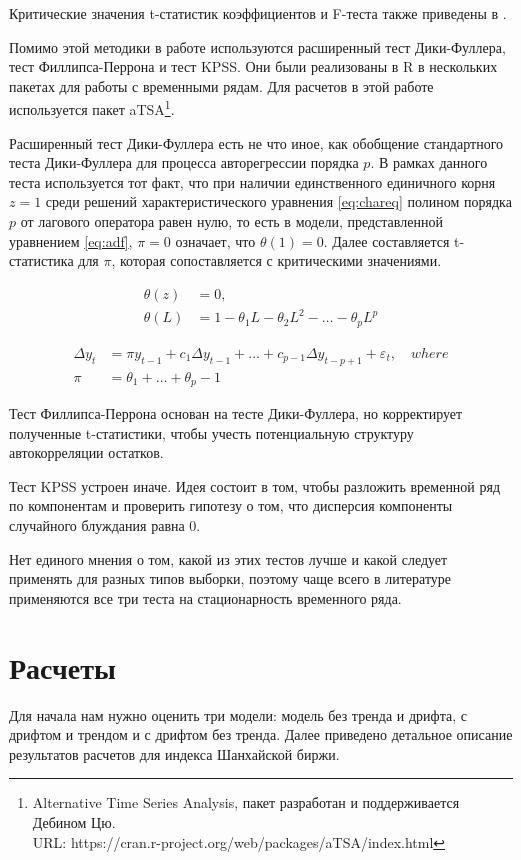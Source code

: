 \documentclass[a4paper,12pt]{article}
\begin{document}
Критические значения t-статистик коэффициентов и F-теста также приведены в \cite{Dickey1981}.

Помимо этой методики в работе используются расширенный тест Дики-Фуллера, тест Филлипса-Перрона и тест KPSS. Они были реализованы в R в нескольких пакетах для работы с временными рядам. Для расчетов в этой работе используется пакет aTSA\footnote{Alternative Time Series Analysis, пакет разработан и поддерживается Дебином Цю. \\URL: https://cran.r-project.org/web/packages/aTSA/index.html}.

Расширенный тест Дики-Фуллера есть не что иное, как обобщение стандартного теста Дики-Фуллера для процесса авторегрессии порядка $p$. В рамках данного теста используется тот факт, что при наличии единственного единичного корня $z=1$ среди решений характеристического уравнения \ref{eq:chareq} полином порядка $p$ от лагового оператора равен нулю, то есть в модели, представленной уравнением \ref{eq:adf}, $\pi=0$ означает, что $\theta(1)=0$. Далее составляется t-статистика для $\pi$, которая сопоставляется с критическими значениями.

\begin{align}
  \label{eq:chareq}
  \theta(z)&=0,\\
  \theta(L)&=1-\theta_1 L-\theta_2 L^2-\ldots-\theta_p L^p
\end{align}

\begin{align}
  \label{eq:adf}
  \Delta y_t&=\pi y_{t-1}+c_1\Delta y_{t-1}+\ldots+c_{p-1}\Delta y_{t-p+1}+\varepsilon_t,\quad where\\
  \pi&=\theta_1+\ldots+\theta_p-1
\end{align}

Тест Филлипса-Перрона основан на тесте Дики-Фуллера, но корректирует полученные t-статистики, чтобы учесть потенциальную структуру автокорреляции остатков.

Тест KPSS устроен иначе. Идея состоит в том, чтобы разложить временной ряд по компонентам и проверить гипотезу о том, что дисперсия компоненты случайного блуждания равна 0.

Нет единого мнения о том, какой из этих тестов лучше и какой следует применять для разных типов выборки, поэтому чаще всего в литературе применяются все три теста на стационарность временного ряда.

\newpage
\section{Расчеты}\label{sec:quant}
Для начала нам нужно оценить три модели: модель без тренда и дрифта, с дрифтом и трендом и с дрифтом без тренда. Далее приведено детальное описание результатов расчетов для индекса Шанхайской биржи.
\end{document}

